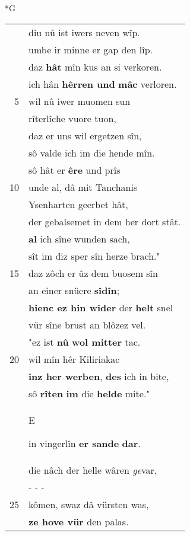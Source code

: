 \documentclass[8pt,a4paper,notitlepage]{article}
\begin{document}
\newpage
\begin{table}[ht]
\begin{minipage}[t]{0.5\linewidth}
\small
\begin{center}*G
\end{center}
\begin{tabular}{rl}
 & diu nû ist iwers neven wîp.\\ 
 & umbe ir minne er gap den lîp.\\ 
 & daz \textbf{hât} mîn kus an si verkoren.\\ 
 & ich hân \textbf{hêrren und} \textbf{mâc} verloren.\\ 
5 & wil nû iwer muomen sun\\ 
 & rîterlîche vuore tuon,\\ 
 & daz er uns wil ergetzen sîn,\\ 
 & sô valde ich im die hende mîn.\\ 
 & sô hât er \textbf{êre} und prîs\\ 
10 & unde al, dâ mit Tanchanis\\ 
 & Ysenharten geerbet hât,\\ 
 & der gebalsemet in dem her dort stât.\\ 
 & \textbf{al} ich sîne wunden sach,\\ 
 & sît im diz sper sîn herze brach."\\ 
15 & daz zôch er ûz dem buosem sîn\\ 
 & an einer snüere \textbf{sîdîn};\\ 
 & \textbf{hienc ez hin wider} der \textbf{helt} snel\\ 
 & vür sîne brust an blôzez vel.\\ 
 & "ez ist \textbf{nû} \textbf{wol mitter} tac.\\ 
20 & wil mîn hêr Kiliriakac\\ 
 & \textbf{inz her werben}, \textbf{des} ich in bite,\\ 
 & sô \textbf{rîten} \textbf{im} die \textbf{helde} mite."\\ 
 & \begin{large}E\end{large}in vingerlîn \textbf{er sande} \textbf{dar}.\\ 
 & die nâch der helle wâren \textit{ge}var,\\ 
 & \multicolumn{1}{l}{ - - - }\\ 
25 & kômen, swaz dâ vürsten was,\\ 
 & \textbf{ze hove vür} den palas.\\ 

\end{tabular}
\end{minipage}
\end{table}
\end{document}
